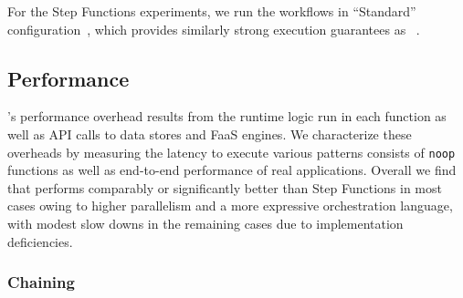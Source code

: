 For the Step Functions experiments, we run the workflows in ``Standard''
configuration~\cite{aws-step-functions-standard-vs-express}, which provides
similarly strong execution guarantees as
\name{}~\cite{aws-step-functions-exec-gntee}.



\subsection{Performance}\label{sec:eval:micro}

\name{}'s performance overhead results from the \name{} runtime logic run in
each function as well as API calls to data stores and FaaS engines. We
characterize these overheads by measuring the latency to execute various
patterns consists of \texttt{noop} functions as well as end-to-end performance
of real applications. Overall we find that \name{} performs comparably or
significantly better than Step Functions in most cases owing to higher
parallelism and a more expressive orchestration language, with modest slow
downs in the remaining cases due to implementation deficiencies.

\subsubsection{Chaining}\label{sec:eval:chain}

